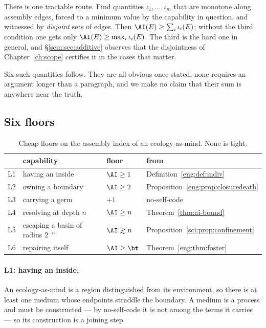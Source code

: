 There is one tractable route. Find quantities $\iota_1, \dots, \iota_m$
that are monotone along assembly edges, forced to a minimum value by the
capability in question, and witnessed by \emph{disjoint} sets of edges.
Then $\AI(E) \ge \sum_i \iota_i(E)$; without the third condition one gets
only $\AI(E) \ge \max_i \iota_i(E)$. The third is the hard one in general,
and \S\ref{scm:sec:additive} observes that the disjointness of
Chapter~\ref{ch:scope} certifies it in the cases that matter.

Six such quantities follow. They are all obvious once stated, none
requires an argument longer than a paragraph, and we make no claim that
their sum is anywhere near the truth.

\subsection{Six floors}

\begin{table}[h]
\centering
\begin{tabular}{clll}
\toprule
 & capability & floor & from \\
\midrule
L1 & having an inside            & $\AI \ge 1$   & Definition~\ref{eng:def:indiv} \\
L2 & owning a boundary           & $\AI \ge 2$   & Proposition~\ref{eng:prop:closuredeath} \\
L3 & carrying a germ             & $+1$          & no-self-code \\
L4 & resolving at depth $n$      & $\AI \ge n$   & Theorem~\ref{thm:ai-bound} \\
L5 & escaping a basin of radius $2^{-n}$ & $\AI \gtrsim n$ & Proposition~\ref{sci:prop:confinement} \\
L6 & repairing itself            & $\AI \ge \bt$ & Theorem~\ref{eng:thm:foster} \\
\bottomrule
\end{tabular}
\caption{Cheap floors on the assembly index of an ecology-as-mind. None is
tight.}
\label{scm:tab:floors}
\end{table}

\paragraph{L1: having an inside.}
An ecology-as-mind is a region distinguished from its environment, so
there is at least one medium whose endpoints straddle the boundary. A
medium is a process and must be constructed --- by no-self-code it is not
among the terms it carries --- so its construction is a joining step.

